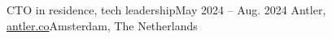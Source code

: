 \resumeSubheading
{CTO in residence, tech leadership}{May 2024 -- Aug. 2024}
{Antler, \href{https://www.antler.co/}{antler.co}}{Amsterdam, The Netherlands}
\resumeItemListStart
\resumeItemListEnd